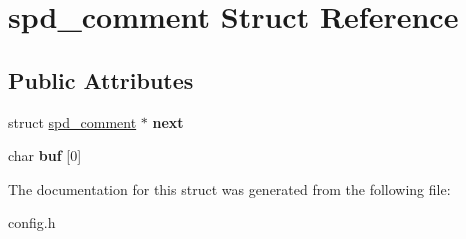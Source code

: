 \hypertarget{structspd__comment}{
\section{spd\_\-comment Struct Reference}
\label{structspd__comment}
}
\subsection*{Public Attributes}
\begin{DoxyCompactItemize}
\item 
\hypertarget{structspd__comment_aa079d94a84a6497347a7bd1f9b548c9f}{
struct \hyperlink{structspd__comment}{spd\_\-comment} $\ast$ {\bfseries next}}
\label{structspd__comment_aa079d94a84a6497347a7bd1f9b548c9f}

\item 
\hypertarget{structspd__comment_a2aca0a684d208195f45a370aedb08bed}{
char {\bfseries buf} \mbox{[}0\mbox{]}}
\label{structspd__comment_a2aca0a684d208195f45a370aedb08bed}

\end{DoxyCompactItemize}


The documentation for this struct was generated from the following file:\begin{DoxyCompactItemize}
\item 
config.h\end{DoxyCompactItemize}
